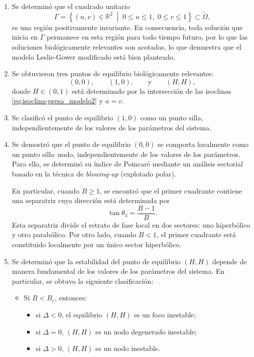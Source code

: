 \begin{enumerate}
	\item Se determinó que el cuadrado unitario
	\[
	\Gamma =
	\left\{
	(u,v)\in\mathbb{R}^{2} \; \middle| \;
	0\leq u\leq 1,\;
	0\leq v\leq 1
	\right\}
	\subset \tilde{\Omega},
	\]
	es una región positivamente invariante. En consecuencia, toda solución que inicia en $\Gamma$ permanece en esta región para todo tiempo futuro, por lo que las soluciones biológicamente relevantes son acotadas, lo que demuestra que el modelo Leslie-Gower modificado está bien planteado.
	
	\item Se obtuvieron tres puntos de equilibrio biológicamente relevantes:
	\[
	(0,0), \qquad (1,0), \qquad \text{y} \qquad (H,H),
	\]
	donde $H\in(0,1)$ está determinado por la intersección de las isoclinas
	\eqref{eq:isoclina-presa_modelo2} y $u=v$.
	
	\item Se clasificó el punto de equilibrio $(1,0)$ como un punto silla, independientemente de los valores de los parámetros del sistema.
	
	\item Se demostró que el punto de equilibrio $(0,0)$ se comporta localmente como un punto silla--nodo, independientemente de los valores de los parámetros. Para ello, se determinó su índice de Poincaré mediante un análisis sectorial basado en la técnica de \emph{blowing-up} (explotado polar).
	
	En particular, cuando $B\geq 1$, se encontró que el primer cuadrante contiene una separatriz cuya dirección está determinada por
	\[
	\tan\theta_3=\dfrac{B-1}{B}.
	\]
	Esta separatriz divide el retrato de fase local en dos sectores: uno hiperbólico y otro parabólico. Por otro lado, cuando $B<1$, el primer cuadrante está constituido localmente por un único sector hiperbólico.
	
	\item Se determinó que la estabilidad del punto de equilibrio $(H,H)$ depende de manera fundamental de los valores de los parámetros del sistema. En particular, se obtuvo la siguiente clasificación:
	
	\begin{itemize}
		\item Si $B<B_c$, entonces:
		\begin{itemize}
			\item si $\Delta<0$, el equilibrio $(H,H)$ es un foco inestable;
			\item si $\Delta=0$, $(H,H)$ es un nodo degenerado inestable;
			\item si $\Delta>0$, $(H,H)$ es un nodo inestable.
		\end{itemize}
		

\end{itemize}
\end{enumerate}
